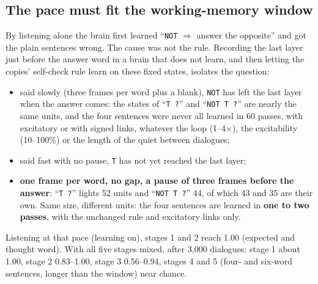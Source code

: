 \documentclass[11pt]{article}
\begin{document}
\subsection{The pace must fit the working-memory window}\label{sec:pace}
By listening alone the brain first learned ``\texttt{NOT} $\Rightarrow$ answer the opposite'' and got the plain sentences
wrong. The cause was not the rule. Recording the last layer just before the answer word in a brain that does not learn, and
then letting the copies' self-check rule learn on these fixed states, isolates the question:
\begin{itemize}
\item said slowly (three frames per word plus a blank), \texttt{NOT} has left the last layer when the answer comes: the
states of ``\texttt{T ?}'' and ``\texttt{NOT T ?}'' are nearly the same units, and the four sentences were never all
learned in 60 passes, with excitatory or with signed links, whatever the loop (1--4$\times$), the excitability
(10--100\%) or the length of the quiet between dialogues;
\item said fast with no pause, \texttt{T} has not yet reached the last layer;
\item \textbf{one frame per word, no gap, a pause of three frames before the answer}: ``\texttt{T ?}'' lights 52 units and
``\texttt{NOT T ?}'' 44, of which 43 and 35 are their own. Same size, different units: the four sentences are learned in
\textbf{one to two passes}, with the unchanged rule and excitatory links only.
\end{itemize}
Listening at that pace (learning on), stages 1 and 2 reach 1.00 (expected and thought word). With all five stages mixed,
after 3,000 dialogues: stage 1 about 1.00, stage 2 0.83--1.00, stage 3 0.56--0.94, stages 4 and 5 (four- and six-word
sentences, longer than the window) near chance.
\end{document}
